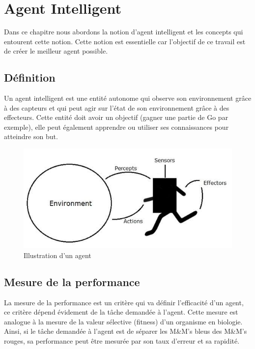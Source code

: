 \documentclass{article}
\begin{document}
\section{Agent Intelligent}

Dans ce chapitre nous abordons la notion d'agent intelligent et les concepts qui entourent cette notion. Cette notion est essentielle car l'objectif de ce travail est de créer le meilleur agent possible.

\subsection{Définition}

Un agent intelligent est une entité autonome qui observe son environnement grâce à des capteurs et qui peut agir sur l'état de son environnement grâce à des effecteurs. Cette entité doit avoir un objectif (gagner une partie de Go par exemple), elle peut également apprendre ou utiliser ses connaissances pour atteindre son but\cite{wikiia}.\\

\begin{figure}[H]
\begin{center}
	\includegraphics[scale=0.5]{agent_environment.jpg}
	\caption{Illustration d'un agent}
\end{center}
\end{figure}

\subsection{Mesure de la performance}

La mesure de la performance est un critère qui va définir l'efficacité d'un agent, ce critère dépend évidement de la tâche demandée à l'agent. Cette mesure est analogue à la mesure de la valeur sélective (fitness) d'un organisme en biologie. Ainsi, si le tâche demandée à l'agent est de séparer les M\&M's bleus des M\&M's rouges, sa performance peut être mesurée par son taux d'erreur et sa rapidité.
\end{document}
